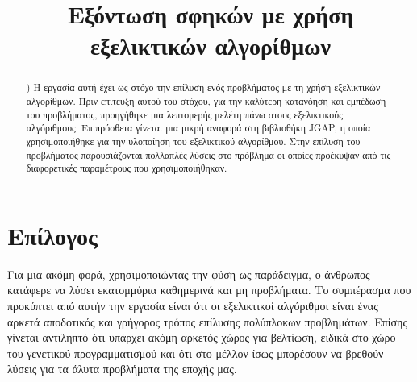 \documentclass[conference, final]{IEEEtran}
\begin{document}
\title{Εξόντωση σφηκών με χρήση εξελικτικών αλγορίθμων}


\author{
\and
{}
}

\maketitle

\begin{abstract})
Η εργασία αυτή έχει ως στόχο την επίλυση ενός προβλήματος με τη χρήση εξελικτικών αλγορίθμων. Πριν επίτευξη αυτού του στόχου, για την καλύτερη κατανόηση και εμπέδωση του προβλήματος, προηγήθηκε μια λεπτομερής μελέτη πάνω στους εξελικτικούς αλγόριθμους. Επιπρόσθετα γίνεται μια μικρή αναφορά στη βιβλιοθήκη JGAP, η οποία χρησιμοποιήθηκε για την υλοποίηση του εξελικτικού αλγορίθμου. Στην επίλυση του προβλήματος παρουσιάζονται πολλαπλές λύσεις στο πρόβλημα οι οποίες προέκυψαν από τις διαφορετικές παραμέτρους που χρησιμοποιήθηκαν.
\end{abstract}


%
\IEEEpeerreviewmaketitle







\section{Επίλογος}

Για μια ακόμη φορά, χρησιμοποιώντας την φύση ως παράδειγμα, ο άνθρωπος κατάφερε να λύσει εκατομμύρια καθημερινά και μη προβλήματα. Το συμπέρασμα που προκύπτει από αυτήν την εργασία είναι ότι οι εξελικτικοί αλγόριθμοι είναι ένας αρκετά αποδοτικός και γρήγορος τρόπος επίλυσης πολύπλοκων προβλημάτων. Επίσης γίνεται αντιληπτό ότι υπάρχει ακόμη αρκετός χώρος για βελτίωση, ειδικά στο χώρο του γενετικού προγραμματισμού και ότι στο μέλλον ίσως μπορέσουν να βρεθούν λύσεις για τα άλυτα προβλήματα της εποχής μας.


\begingroup
\raggedright
\printbibliography
\endgroup
\end{document}

